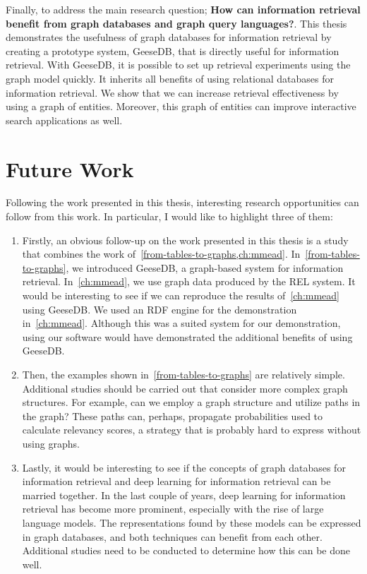 Finally, to address the main research question; \textbf{How can information retrieval benefit from graph databases and graph query languages?}. This thesis demonstrates the usefulness of graph databases for information retrieval by creating a prototype system, GeeseDB, that is directly useful for information retrieval. With GeeseDB, it is possible to set up retrieval experiments using the graph model quickly. It inherits all benefits of using relational databases for information retrieval. We show that we can increase retrieval effectiveness by using a graph of entities. Moreover, this graph of entities can improve interactive search applications as well.    

\section{Future Work}
Following the work presented in this thesis, interesting research opportunities can follow from this work. In particular, I would like to highlight three of them:
\begin{enumerate}
	\item Firstly, an obvious follow-up on the work presented in this thesis is a study that combines the work of~\cref{from-tables-to-graphs,ch:mmead}. In~\cref{from-tables-to-graphs}, we introduced GeeseDB, a graph-based system for information retrieval. In~\cref{ch:mmead}, we use graph data produced by the REL system. It would be interesting to see if we can reproduce the results of~\cref{ch:mmead} using GeeseDB. We used an RDF engine for the demonstration in~\cref{ch:mmead}. Although this was a suited system for our demonstration, using our software would have demonstrated the additional benefits of using GeeseDB. 
	\item Then, the examples shown in~\cref{from-tables-to-graphs} are relatively simple. Additional studies should be carried out that consider more complex graph structures. For example, can we employ a graph structure and utilize paths in the graph? These paths can, perhaps, propagate probabilities used to calculate relevancy scores, a strategy that is probably hard to express without using graphs. 
	\item Lastly, it would be interesting to see if the concepts of graph databases for information retrieval and deep learning for information retrieval can be married together. In the last couple of years, deep learning for information retrieval has become more prominent, especially with the rise of large language models. The representations found by these models can be expressed in graph databases, and both techniques can benefit from each other. Additional studies need to be conducted to determine how this can be done well. 
\end{enumerate} 